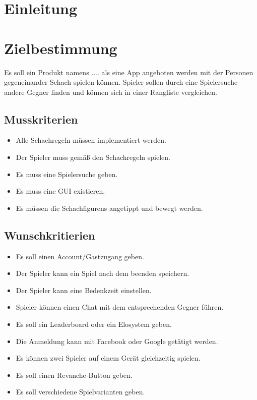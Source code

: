 \documentclass[parskip=full]{scrartcl}
\title\large{PSE Pflichtenheft}
\author\textit{Rukiye Devran, Tim Groß, Daniel Helmig, Orkhan Aliev, Florian Weber}
\begin{document}
	\begin{titlepage}
	\maketitle
	\newpage	
	\tableofcontents
	\pagebreak
	
	\end{titlepage}
\section{Einleitung}
\section{Zielbestimmung}
Es soll ein Produkt namens .... als eine App angeboten werden mit der Personen gegeneinander \gls{Schach} spielen können. Spieler sollen durch eine Spielersuche andere Gegner finden und können sich in einer Rangliste vergleichen. 
\subsection{Musskriterien}
\begin{itemize}[nosep]
\item Alle \gls{Schachregeln} müssen implementiert werden.
\item Der \gls{Spieler} muss gemäß den \gls{Schachregeln} spielen.
\item Es muss eine Spielersuche geben.
\item Es muss eine GUI existieren.
\item Es müssen die \glspl{Schachfiguren} angetippt und bewegt werden.
\end{itemize}
\subsection{Wunschkritierien}
\begin{itemize}[nosep]
\item Es soll einen Account/Gastzugang geben.
\item Der \gls{Spieler} kann ein Spiel nach dem beenden speichern.
\item Der \gls{Spieler} kann eine Bedenkzeit einstellen.
\item \gls{Spieler} können einen Chat mit dem entsprechenden Gegner führen.
\item Es soll ein Leaderboard oder ein \gls{Elo}system geben.
\item Die Anmeldung kann mit Facebook oder Google getätigt werden.
\item Es können zwei \gls{Spieler} auf einem Gerät gleichzeitig spielen.
\item Es soll einen Revanche-Button geben.
\item Es soll verschiedene Spielvarianten geben.
\end{itemize}
\end{document}
